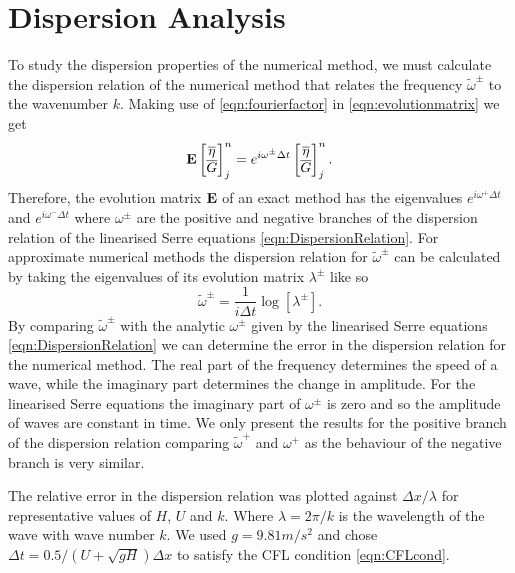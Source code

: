 \section{Dispersion Analysis}
To study the dispersion properties of the numerical method, we must calculate the dispersion relation of the numerical method that relates the frequency $\widetilde{\omega}^\pm$ to the wavenumber $k$. Making use of \eqref{eqn:fourierfactor} in \eqref{eqn:evolutionmatrix} we get
\begin{equation}\mathbf{E}\begin{bmatrix}
\overline{\eta} \\ \overline{G}
\end{bmatrix}^{n}_j = 
e^{i \omega^\pm \Delta t}\begin{bmatrix}
\overline{\eta} \\ \overline{G}
\end{bmatrix}^{n}_j.
\label{eqn:dispanalomeganum1}
\end{equation}
Therefore, the evolution matrix $\mathbf{E}$ of an exact method has the eigenvalues $e^{i \omega^+ \Delta t}$ and $e^{i \omega^- \Delta t}$ where $\omega^\pm$ are the positive and negative branches of the dispersion relation of the linearised Serre equations \eqref{eqn:DispersionRelation}. For approximate numerical methods the dispersion relation for $\widetilde{\omega}^\pm$ can be calculated by taking the eigenvalues of its evolution matrix $\lambda^\pm$ like so
\begin{equation*}
\widetilde{\omega}^\pm = \frac{1}{i \Delta t} \log\left[ \lambda^\pm\right].
\end{equation*}
By comparing $\widetilde{\omega}^\pm$ with the analytic $\omega^\pm$ given by the linearised Serre equations \eqref{eqn:DispersionRelation} we can determine the error in the dispersion relation for the numerical method. The real part of the frequency determines the speed of a wave, while the imaginary part determines the change in amplitude. For the linearised Serre equations the imaginary part of $\omega^\pm$ is zero and so the amplitude of waves are constant in time. We only present the results for the positive branch of the dispersion relation comparing $\widetilde{\omega}^+$ and $\omega^+$ as the behaviour of the negative branch is very similar. 

The relative error in the dispersion relation was plotted against $\Delta x / \lambda$ for representative values of $H$, $U$ and $k$. Where $\lambda = 2 \pi / k$ is the wavelength of the wave with wave number $k$. We used $g = 9.81m/s^2$ and chose $\Delta t = 0.5 / \left(U + \sqrt{gH}\right) \Delta x$ to satisfy the CFL condition \eqref{eqn:CFLcond}.

